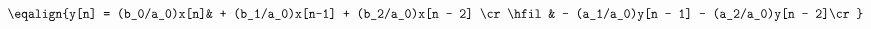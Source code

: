 \hsize 0pt
\vsize 0pt
\nopagenumbers
\overfullrule 0pt
\noindent
$$
\eqalign{y[n] = (b_0/a_0)x[n]& + (b_1/a_0)x[n-1] + (b_2/a_0)x[n - 2] \cr
\hfil & - (a_1/a_0)y[n - 1] - (a_2/a_0)y[n - 2]\cr
}
$$
\bye